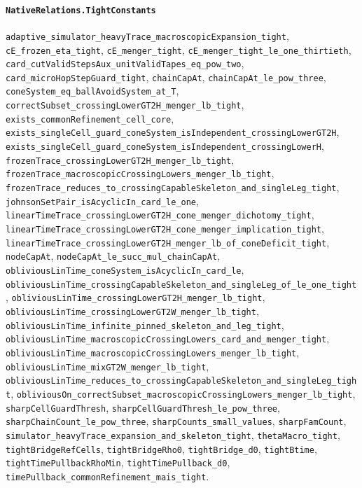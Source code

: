 \paragraph{\texttt{NativeRelations.TightConstants}}
{\small\raggedright \texttt{adaptive\_simulator\_heavyTrace\_macroscopicExpansion\_tight}, \texttt{cE\_frozen\_eta\_tight}, \texttt{cE\_menger\_tight}, \texttt{cE\_menger\_tight\_le\_one\_thirtieth}, \texttt{card\_cutValidStepsAux\_unitValidTapes\_eq\_pow\_two}, \texttt{card\_microHopStepGuard\_tight}, \texttt{chainCapAt}, \texttt{chainCapAt\_le\_pow\_three}, \texttt{coneSystem\_eq\_ballAvoidSystem\_at\_T}, \texttt{correctSubset\_crossingLowerGT2H\_menger\_lb\_tight}, \texttt{exists\_commonRefinement\_cell\_core}, \texttt{exists\_singleCell\_guard\_coneSystem\_isIndependent\_crossingLowerGT2H}, \texttt{exists\_singleCell\_guard\_coneSystem\_isIndependent\_crossingLowerH}, \texttt{frozenTrace\_crossingLowerGT2H\_menger\_lb\_tight}, \texttt{frozenTrace\_macroscopicCrossingLowers\_menger\_lb\_tight}, \texttt{frozenTrace\_reduces\_to\_crossingCapableSkeleton\_and\_singleLeg\_tight}, \texttt{johnsonSetPair\_isAcyclicIn\_card\_le\_one}, \texttt{linearTimeTrace\_crossingLowerGT2H\_cone\_menger\_dichotomy\_tight}, \texttt{linearTimeTrace\_crossingLowerGT2H\_cone\_menger\_implication\_tight}, \texttt{linearTimeTrace\_crossingLowerGT2H\_menger\_lb\_of\_coneDeficit\_tight}, \texttt{nodeCapAt}, \texttt{nodeCapAt\_le\_succ\_mul\_chainCapAt}, \texttt{obliviousLinTime\_coneSystem\_isAcyclicIn\_card\_le}, \texttt{obliviousLinTime\_crossingCapableSkeleton\_and\_singleLeg\_of\_le\_one\_tight}, \texttt{obliviousLinTime\_crossingLowerGT2H\_menger\_lb\_tight}, \texttt{obliviousLinTime\_crossingLowerGT2W\_menger\_lb\_tight}, \texttt{obliviousLinTime\_infinite\_pinned\_skeleton\_and\_leg\_tight}, \texttt{obliviousLinTime\_macroscopicCrossingLowers\_card\_and\_menger\_tight}, \texttt{obliviousLinTime\_macroscopicCrossingLowers\_menger\_lb\_tight}, \texttt{obliviousLinTime\_mixGT2W\_menger\_lb\_tight}, \texttt{obliviousLinTime\_reduces\_to\_crossingCapableSkeleton\_and\_singleLeg\_tight}, \texttt{obliviousOn\_correctSubset\_macroscopicCrossingLowers\_menger\_lb\_tight}, \texttt{sharpCellGuardThresh}, \texttt{sharpCellGuardThresh\_le\_pow\_three}, \texttt{sharpChainCount\_le\_pow\_three}, \texttt{sharpCounts\_small\_values}, \texttt{sharpFamCount}, \texttt{simulator\_heavyTrace\_expansion\_and\_skeleton\_tight}, \texttt{thetaMacro\_tight}, \texttt{tightBridgeRefCells}, \texttt{tightBridgeRho0}, \texttt{tightBridge\_d0}, \texttt{tightBtime}, \texttt{tightTimePullbackRhoMin}, \texttt{tightTimePullback\_d0}, \texttt{timePullback\_commonRefinement\_mais\_tight}.\par}

